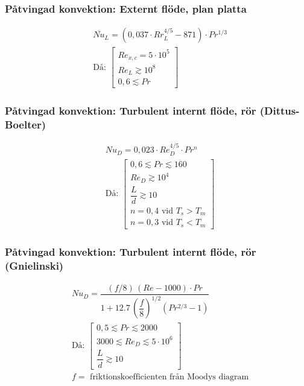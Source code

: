 	\subsubsection*{Påtvingad konvektion: Externt flöde, plan platta}
	\begin{align*}
		&\overline{Nu}_L = (0,037 \cdot {Rr_L^{4/5}}-871) \cdot Pr^{1/3}\\[8pt]
		&\text{Då: } 
		\left[
			\begin{array}{l}
		Re_{x,c} = 5 \cdot 10^5\\ 
		Re_L \gtrsim 10^8\\ 
		0,6 \lesssim Pr
		\end{array}
		\right]
	\end{align*}
	\subsubsection*{Påtvingad konvektion: Turbulent internt flöde, rör (Dittus-Boelter)}
	\begin{align*}
	& Nu_D = 0,023 \cdot Re^{4/5}_D \cdot Pr^n\\[10pt]
	& \text{Då: } 
	\left[
	\begin{array}{l}
	0,6 \lesssim Pr \lesssim 160 \\
	Re_D \gtrsim 10^4 \\
	\dfrac{L}{d} \gtrsim 10\\
	n = 0,4 \text{ vid } T_s > T_m \\
	n = 0,3 \text{ vid } T_s < T_m
	\end{array}
	\right]
	\end{align*}
	\subsubsection*{Påtvingad konvektion: Turbulent internt flöde, rör (Gnielinski)}
	\begin{align*}
	&Nu_D =  \dfrac{(f/8)\,(Re - 1000)\cdot Pr}
  {1 + 12.7\,\left(\dfrac{f}{8}\right)^{1/2}\left(Pr^{2/3} - 1\right)} \\[8pt]
	&\text{Då: }
	\left[
		\begin{array}{l}
	0,5 \lesssim Pr \lesssim 2000	\\
	3000 \lesssim Re_D \lesssim 5 \cdot 10^6 \\
	\dfrac{L}{d} \gtrsim 10
	\end{array} 
	\right]
	\\[8pt]
	&f = \text{ friktionskoefficienten från Moodys diagram}
	\end{align*}
